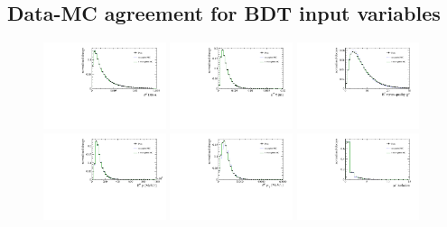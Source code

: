 \subsection{Data-MC agreement for BDT input variables}
\label{sec:appendix:data-mc-bdtvars}
 
\begin{figure}[!hb]
 \centering
 \includegraphics[width=0.32\textwidth]{figs/kpimm/data-mc/bdt/B0_DiraAngle.pdf}
 \includegraphics[width=0.32\textwidth]{figs/kpimm/data-mc/bdt/B0_TAU.pdf}
 \includegraphics[width=0.32\textwidth]{figs/kpimm/data-mc/bdt/B0_ENDVERTEX_CHI2.pdf}
 \includegraphics[width=0.32\textwidth]{figs/kpimm/data-mc/bdt/B0_P.pdf}
 \includegraphics[width=0.32\textwidth]{figs/kpimm/data-mc/bdt/B0_PT.pdf}
 \includegraphics[width=0.32\textwidth]{figs/kpimm/data-mc/bdt/Muplus_isolation_V2_15.pdf}

\end{figure}

